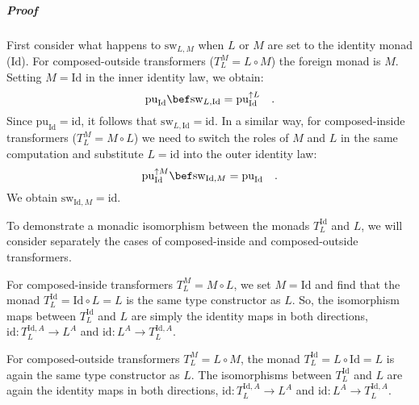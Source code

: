 \subparagraph{Proof}

First consider what happens to $\text{sw}_{L,M}$ when $L$ or $M$
are set to the identity monad ($\text{Id}$). For composed-outside
transformers ($T_{L}^{M}=L\circ M$) the foreign monad is $M$. Setting
$M=\text{Id}$ in the inner identity law, we obtain: 
\[
\text{pu}_{\text{Id}}\bef\text{sw}_{L,\text{Id}}=\text{pu}_{\text{Id}}^{\uparrow L}\quad.
\]
Since $\text{pu}_{\text{Id}}=\text{id}$, it follows that $\text{sw}_{L,\text{Id}}=\text{id}$.
In a similar way, for composed-inside transformers ($T_{L}^{M}=M\circ L$)
we need to switch the roles of $M$ and $L$ in the same computation
and substitute $L=\text{id}$ into the outer identity law:
\[
\text{pu}_{\text{Id}}^{\uparrow M}\bef\text{sw}_{\text{Id},M}=\text{pu}_{\text{Id}}\quad.
\]
We obtain $\text{sw}_{\text{Id},M}=\text{id}$.

\begin{comment}
Note that $\text{sw}_{L,\text{Id}}:L^{A}\rightarrow L^{A}$ is a natural
transformation for a monad $L$, so one may heuristically expect $\text{sw}_{L,\text{Id}}$
to be equal to the identity map (the only natural transformation $L^{A}\rightarrow L^{A}$
that exists for all monads $L$). Similarly, one may expect that $\text{sw}_{\text{Id},M}:M^{A}\rightarrow M^{A}=\text{id}$
since it is a natural transformation. But these are only heuristic
expectations, while we have just shown that the properties $\text{sw}_{L,\text{Id}}=\text{id}$
and $\text{sw}_{\text{Id},M}=\text{id}$ follow from the previously
established laws of \lstinline!swap! without any new assumptions.
These properties will be needed in the proofs below. 
\end{comment}
To demonstrate a monadic isomorphism between the monads $T_{L}^{\text{Id}}$
and $L$, we will consider separately the cases of composed-inside
and composed-outside transformers.

For composed-inside transformers $T_{L}^{M}=M\circ L$, we set $M=\text{Id}$
and find that the monad $T_{L}^{\text{Id}}=\text{Id}\circ L=L$ is
the same type constructor as $L$. So, the isomorphism maps between
$T_{L}^{\text{Id}}$ and $L$ are simply the identity maps in both
directions, $\text{id}:T_{L}^{\text{Id},A}\rightarrow L^{A}$ and
$\text{id}:L^{A}\rightarrow T_{L}^{\text{Id},A}$. 

For composed-outside transformers $T_{L}^{M}=L\circ M$, the monad
$T_{L}^{\text{Id}}=L\circ\text{Id}=L$ is again the same type constructor
as $L$. The isomorphisms between $T_{L}^{\text{Id}}$ and $L$ are
again the identity maps in both directions, $\text{id}:T_{L}^{\text{Id},A}\rightarrow L^{A}$
and $\text{id}:L^{A}\rightarrow T_{L}^{\text{Id},A}$. 

